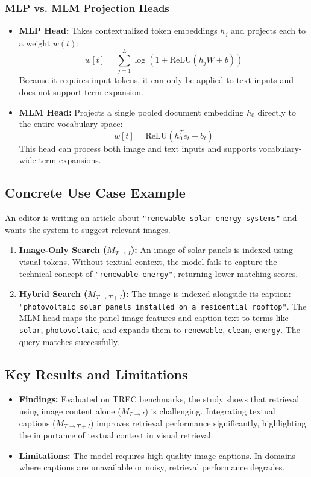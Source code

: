 \documentclass[11pt,a4paper]{article}
\begin{document}
\subsubsection{MLP vs. MLM Projection Heads}
\begin{itemize}
    \item \textbf{MLP Head:} Takes contextualized token embeddings $h_j$ and projects each to a weight $w(t)$:
    \begin{equation}
    w[t] = \sum_{j=1}^L \log(1 + \text{ReLU}(h_j W + b))
    \end{equation}
    Because it requires input tokens, it can only be applied to text inputs and does not support term expansion.
    \item \textbf{MLM Head:} Projects a single pooled document embedding $h_0$ directly to the entire vocabulary space:
    \begin{equation}
    w[t] = \text{ReLU}(h_0^T e_t + b_t)
    \end{equation}
    This head can process both image and text inputs and supports vocabulary-wide term expansions.
\end{itemize}

\subsection{Concrete Use Case Example}
An editor is writing an article about \texttt{"renewable solar energy systems"} and wants the system to suggest relevant images.
\begin{enumerate}
    \item \textbf{Image-Only Search ($M_{T \to I}$):} An image of solar panels is indexed using visual tokens. Without textual context, the model fails to capture the technical concept of \texttt{"renewable energy"}, returning lower matching scores.
    \item \textbf{Hybrid Search ($M_{T \to T+I}$):} The image is indexed alongside its caption: \texttt{"photovoltaic solar panels installed on a residential rooftop"}. The MLM head maps the panel image features and caption text to terms like \texttt{solar}, \texttt{photovoltaic}, and expands them to \texttt{renewable}, \texttt{clean}, \texttt{energy}. The query matches successfully.
\end{enumerate}

\subsection{Key Results and Limitations}
\begin{itemize}
    \item \textbf{Findings:} Evaluated on TREC benchmarks, the study shows that retrieval using image content alone ($M_{T \to I}$) is challenging. Integrating textual captions ($M_{T \to T+I}$) improves retrieval performance significantly, highlighting the importance of textual context in visual retrieval.
    \item \textbf{Limitations:} The model requires high-quality image captions. In domains where captions are unavailable or noisy, retrieval performance degrades.
\end{itemize}
\end{document}
